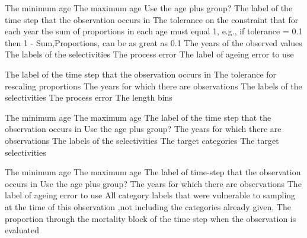 \par\textbf{}\par
{} {The minimum age}
 {The maximum age}
 {Use the age plus group?}
 {The label of the time step that the observation occurs in}
 {The tolerance on the constraint that for each year the sum of proportions in each age must equal 1, e.g., if tolerance = 0.1 then 1 - Sum,Proportions, can be as great as 0.1}
 {The years of the observed values}
 {The labels of the selectivities}
 {The process error}
 {The label of ageing error to use}
\par\textbf{}\par
{} {The label of the time step that the observation occurs in}
 {The tolerance for rescaling proportions}
 {The years for which there are observations}
 {The labels of the selectivities}
 {The process error}
 {The length bins}
\par\textbf{}\par
{} {The minimum age}
 {The maximum age}
 {The label of the time step that the observation occurs in}
 {Use the age plus group?}
 {The years for which there are observations}
 {The labels of the selectivities}
 {The target categories}
 {The target selectivities}
\par\textbf{}\par
{} {The minimum age}
 {The maximum age}
 {The label of time-step that the observation occurs in}
 {Use the age plus group?}
 {The years for which there are observations}
 {The label of ageing error to use}
 {All category labels that were vulnerable to sampling at the time of this observation ,not including the categories already given,}
 {The proportion through the mortality block of the time step when the observation is evaluated}
\par\textbf{}\par
